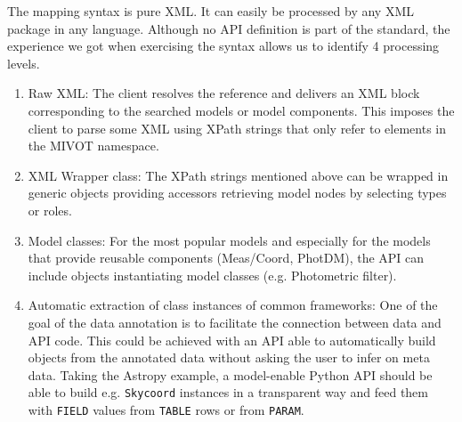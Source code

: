 The mapping syntax is pure XML. It can easily be processed by any XML package in any language.
Although no API definition is part of the standard, the experience we got when exercising the syntax allows us to identify 
4 processing levels.

\begin{enumerate} 
  \item Raw XML: The client resolves the reference and delivers an XML block corresponding to the searched models or model components. 
          This imposes the client to parse some XML using XPath strings that only refer to elements in the MIVOT namespace.
  \item XML Wrapper class: The XPath strings mentioned above can be wrapped in generic objects providing accessors retrieving model nodes by selecting types or roles. 
  \item Model classes: For the most popular models and especially for the models that provide reusable components (Meas/Coord, PhotDM), the API can include objects instantiating model classes (e.g. Photometric filter).
  \item Automatic extraction of class instances of common frameworks: One of the goal of the data annotation is to facilitate the connection between data and API code. This could be achieved with an API able to automatically build objects from the annotated data without asking the user to infer on meta data. Taking the Astropy example, a model-enable Python API should be able to build e.g. \texttt{Skycoord} instances in a transparent way and feed them with \texttt{FIELD} values from \texttt{TABLE} rows or from \texttt{PARAM}.
 \end{enumerate}

